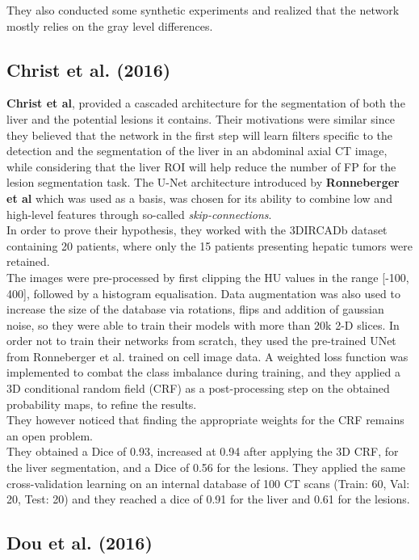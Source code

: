 They also conducted some synthetic experiments and realized that the
network mostly relies on the gray level differences.

\subsection*{Christ et al. (2016)}\label{christ-et-al.-2016}

\textbf{Christ et al}, provided a cascaded architecture for the
segmentation of both the liver and the potential lesions it contains.
Their motivations were similar since they believed that the network in
the first step will learn filters specific to the detection and the
segmentation of the liver in an abdominal axial CT image, while
considering that the liver ROI will help reduce the number of FP for the
lesion segmentation task. The U-Net architecture introduced by
\textbf{Ronneberger et al} which was used as a basis, was chosen for its
ability to combine low and high-level features through so-called
\emph{skip-connections}. \\
In order to prove their hypothesis, they worked with the 3DIRCADb
dataset containing 20 patients, where only the 15 patients presenting
hepatic tumors were retained. \\
The images were pre-processed by first clipping the HU values in the
range {[}-100, 400{]}, followed by a histogram equalisation. Data
augmentation was also used to increase the size of the database via
rotations, flips and addition of gaussian noise, so they were able to
train their models with more than 20k 2-D slices. In order not to train
their networks from scratch, they used the pre-trained UNet from
Ronneberger et al. trained on cell image data. A weighted loss function
was implemented to combat the class imbalance during training, and they
applied a 3D conditional random field (CRF) as a post-processing step on
the obtained probability maps, to refine the results.\\
They however noticed that finding the appropriate weights for the CRF
remains an open problem.\\
They obtained a Dice of 0.93, increased at 0.94 after applying the 3D
CRF, for the liver segmentation, and a Dice of 0.56 for the lesions.
They applied the same cross-validation learning on an internal database
of 100 CT scans (Train: 60, Val: 20, Test: 20) and they reached a dice
of 0.91 for the liver and 0.61 for the lesions.

\subsection*{Dou et al. (2016)}\label{dou-et-al.-2016}

